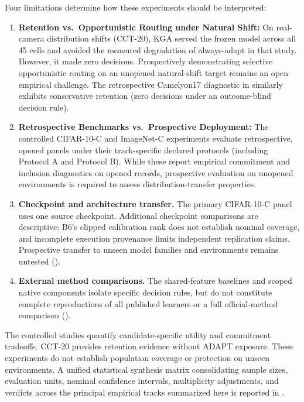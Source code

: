 Four limitations determine how these experiments should be interpreted:
\begin{enumerate}
  \item \textbf{Retention vs.\ Opportunistic Routing under Natural Shift:} On real-camera distribution shifts
  (CCT-20), KGA served the frozen model across all 45 cells and avoided the measured degradation of always-adapt
  in that study. However, it made zero \adapt decisions. Prospectively demonstrating selective opportunistic routing on an unopened natural-shift target remains an open empirical challenge. The retrospective Camelyon17 diagnostic in  similarly exhibits conservative retention (zero \adapt decisions under an outcome-blind decision rule).
  \item \textbf{Retrospective Benchmarks vs.\ Prospective Deployment:} The controlled CIFAR-10-C and ImageNet-C
  experiments evaluate retrospective, opened panels under their track-specific declared protocols (including Protocol A and Protocol B). While these report empirical
  commitment and inclusion diagnostics on opened records, prospective evaluation on unopened environments is
  required to assess distribution-transfer properties.
  \item \textbf{Checkpoint and architecture transfer.} The primary CIFAR-10-C panel uses one
  source checkpoint. Additional checkpoint comparisons are descriptive: B6's clipped calibration
  rank does not establish nominal coverage, and incomplete execution provenance limits independent
  replication claims. Prospective transfer to unseen model families and environments remains
  untested ().
  \item \textbf{External method comparisons.} The shared-feature baselines and scoped native
  components isolate specific decision rules, but do not constitute complete reproductions of
  all published learners or a full official-method comparison
  ().

\end{enumerate}
The controlled studies
quantify candidate-specific utility and commitment tradeoffs. CCT-20 provides retention evidence without
ADAPT exposure. These experiments do not establish population coverage or protection on unseen environments.
A unified statistical synthesis matrix consolidating sample sizes, evaluation units, nominal confidence intervals, multiplicity adjustments, and verdicts across the principal empirical tracks summarized here is reported in .

